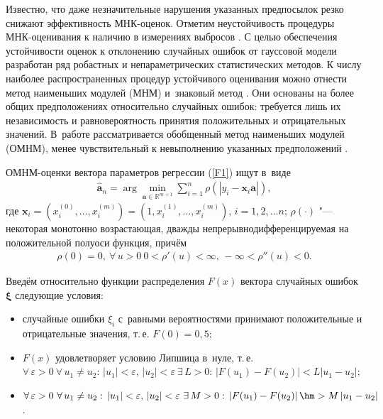 Известно, что даже незначительные нарушения указанных предпосылок
резко снижают эффективность МНК-оценок. Отметим неустойчивость
процедуры МНК-оценивания к наличию в измерениях выбросов
{\cite{second}}. С целью обеспечения устойчивости
оценок к отклонению случайных ошибок от гауссовой
модели разработан ряд робастных и непараметрических статистических
методов. К числу наиболее распространенных процедур устойчивого
оценивания можно отнести метод наименьших модулей (МНМ)
{\cite{third}} и~знаковый метод {\cite{fourth}}. Они основаны на
более общих предположениях относительно случайных ошибок: требуется
лишь их независимость и  равновероятность
принятия положительных и отрицательных значений. В~работе
рассматривается обобщенный метод наименьших модулей (ОМНМ), менее
чувствительный к невыполнению указанных предположений
{\cite{fifth}}. 

\smallskip

ОМНМ-оценки вектора параметров регрессии (\ref{F1}) ищут в~виде
{\cite{fifth}}
\begin{gather} \label{F2}
\mathbf{\hat{a}}_{n}=\arg\min _{\mathbf{a} \in \mathbb{R}^{m+1}}
\sum_{i=1}^n \rho \left( \left
|y_{i}-\mathbf{x}_{i}\mathbf{a}\right| \right),
\end{gather}
где $\mathbf{x}_{i} = (x_{i}^{(0)},\ldots,x_{i}^{(m)})
= (1,x_{i}^{(1)},\ldots,x_{i}^{(m)})$, $i = 1, 2,\dots n$;
$\rho(\cdot)$ "--- некоторая монотонно возрастающая, дважды
непрерывнодифференцируемая на положительной полуоси функция,
причём
\begin{gather} \label{F3}
\rho(0)=0, ~ \forall \, u > 0 ~ 0 < \rho'(u) <\infty, \, -\infty <
\rho''(u) < 0.
\end{gather}

Введём относительно функции распределения $F(x)$ вектора случайных ошибок $\boldsymbol{\xi}$ следующие условия:

\begin{itemize}
\item[$6^{\circ}$)] случайные ошибки $\xi_{i}$ с~равными
вероятностями принимают положительные и отрицательные значения,
т.\,е. $F(0)=0,5$;

\item[$7^{\circ}$)]  $F(x)$ удовлетворяет условию Липшица в~нуле,
т.\,е. $\forall \, \varepsilon >0 ~ \forall \, u_{1} \neq u_{2}: \,
\left |u_{1}\right| < \varepsilon, \, \left |u_{2}\right| <
\varepsilon ~ \exists \, L > 0: \, \left |F(u_{1})-F(u_{2})\right|
< L\left |u_{1}-u_{2}\right|;$

\item[$8^{\circ}$)]  $\forall \, \varepsilon >0 ~ \forall \, u_{1}
\neq u_{2}: \, \left |u_{1}\right| < \varepsilon, \, \left
|u_{2}\right| < \varepsilon ~ \exists \, M > 0: \, \left
|F(u_{1})-F(u_{2})\right| \hm > M\left |u_{1}-u_{2}\right|$.

\end{itemize}

